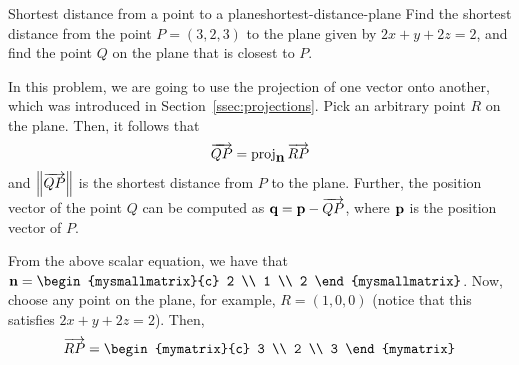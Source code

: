 \begin{example}{Shortest distance from a point to a plane}{shortest-distance-plane}
  Find the shortest distance from the point $P = (3,2,3)$ to the plane
  given by $2x + y + 2z = 2$, and find the point $Q$ on the plane
  that is closest to $P$.%
\end{example}

\begin{solution}
  In this problem, we are going to use the projection of one vector
  onto another, which was introduced in
  Section~\ref{ssec:projections}.  Pick an arbitrary point $R$ on
  the plane. Then, it follows that
  \[
    \overrightarrow{QP} = \mbox{\rm proj}_{\mbox{\bf n}}\,\overrightarrow{RP}
  \]
  and $\left\|\overrightarrow{QP}\right\|$ is the shortest distance from $P$ to the
  plane. Further, the position vector of the point $Q$ can be computed
  as $\mbox{\bf q} = \mbox{\bf p} - \overrightarrow{QP}$, where $\mbox{\bf p}$ is the
  position vector of $P$.
  \begin{center}
  \end{center}
  From the above scalar equation, we have that $\vect{n} =
  \begin{mysmallmatrix}{c} 2 \\ 1 \\ 2 \end{mysmallmatrix}$.  Now, choose any
  point on the plane, for example, $R = (1,0,0)$ (notice that this
  satisfies $2x+y+2z=2$).  Then,
  \begin{equation*}
    \longvect{RP} = \begin{mymatrix}{c} 3 \\ 2 \\ 3 \end{mymatrix}

\end{equation*}
\end{solution}
